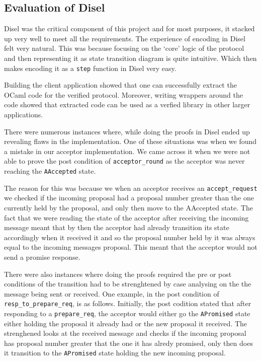 \subsection{Evaluation of Disel}
Disel was the critical component of this project and for most purposes, it
stacked up very well to meet all the requirements.
The experience of encoding in Disel felt very natural. This was because
focusing on the `core' logic of the protocol and then representing it
as state transition diagram is quite intuitive. Which then makes
encoding it as a \texttt{step} function in Disel very easy.

Building the client application showed that one can successfully extract
the OCaml code for the verified protocol. Moreover, writing wrappers
around the code showed that extracted code can be used as a verfied library
in other larger applications.

There were numerous instances where, while doing the proofs in Disel
ended up revealing flaws in the implementation. One of these situations was
when we found a mistake in our acceptor implementation. We came
across it when we were not able to prove the post condition of \texttt{acceptor\_round}
as the acceptor was never reaching the \texttt{AAccepted} state.

The reason for this was because we when an acceptor receives an \texttt{accept\_request}
we checked if the incoming proposal had a proposal number greater than the one
currently held by the proposal, and only then move to the AAccepted state. The fact
that we were reading the state of the acceptor after receiving the incoming message
meant that by then the acceptor had already transition its state accordingly
when it received it and so the proposal number held by it was always
equal to the incoming messages proposal. This meant that the acceptor would not
send a promise response.

There were also instances where doing the proofs required the pre or post conditions
of the transition had to
be strenghtened by case analysing on the the message being sent or received.
One example, in the post condition of \texttt{resp\_to\_prepare\_req}, is as follows. Initially,
the post codition stated that after responding to a \texttt{prepare\_req},
the acceptor would either go the \texttt{APromised} state either holding the
proposal it already had or the new proposal it received. The strenghened
looks at the received message and checks if the incoming proposal has proposal
number greater that the one it has alredy promised, only then does it transition
to the \texttt{APromised} state holding the new incoming proposal.

